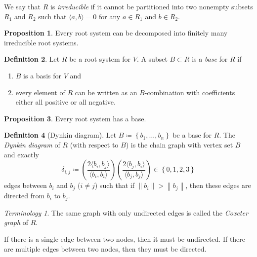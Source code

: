 \documentclass[10pt,letterpaper,cm]{nupset}
\theoremstyle{definition}
\newtheorem{defn}{Definition}[subsection]
\theoremstyle{theorem}
\newtheorem{prop}[defn]{Proposition}
\theoremstyle{remark}
\newtheorem*{term}{Terminology}
\newcommand{\1}{\mathbb{1}}
\newcommand{\0}{\vec 0}
\newcommand{\be}{\begin{enumerate}}
\newcommand{\ee}{\end{enumerate}}
\begin{document}
\smallskip

We say that $R$ is \textit{irreducible} if it cannot be partitioned into two nonempty subsets $R_1$ and $R_2$ such that $\langle a,b\rangle =0$ for any $a\in R_1$ and $b\in R_2$.
\begin{prop}
Every root system can be decomposed into finitely many irreducible root systems.
\end{prop}

\begin{defn} Let $R$ be a root system for $V$.
A subset $B\subset R$  is a \textit{base} for $R$ if 
\be[label=(\roman*)]
\item $B$ is a basis for $V$ and
\item every element of $R$ can be written as an $B$-combination with coefficients either all positive or all negative. 
\ee
\end{defn}

\begin{prop}
Every root system has a base.
\end{prop}

\begin{defn}[Dynkin diagram]
Let $B\coloneqq \left\{b_1, \ldots, b_n\right\}$ be a base for $R$. The \textit{Dynkin diagram} of $R$ (with respect to $B$) is the chain graph with vertex set $B$ and exactly
\[
\delta_{i,j} \coloneqq \left(\frac{2\langle b_i, b_j\rangle}{\langle b_i, b_i\rangle} \right) \left(\frac{2\langle b_j, b_i\rangle}{\langle b_j, b_j\rangle}\right) \in \left\{0,1,2,3\right\}
\] edges between $b_i$ and $b_j$ ($i\ne j$) such that if $\left\|b_i\right\| > \left\|b_j\right\|$, then these edges are directed from $b_i$ to $b_j$.
\end{defn}

\begin{term}
The same graph with only undirected edges is called the \textit{Coxeter graph} of $R$.
\end{term}

If there is a single edge between two nodes, then it must be undirected. If there are multiple edges between two nodes, then they must be directed.
\end{document}
